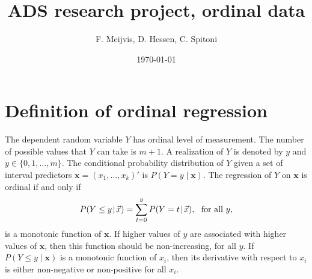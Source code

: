 \documentclass[12pt]{article}
\begin{document}
	
	
\title{ADS research project, ordinal data}%
\author{F. Meijvis, D. Hessen, C. Spitoni}
\date{\today}
	
\maketitle

\section{Definition of ordinal regression}

The dependent random variable $Y$ has ordinal level of measurement. The number of possible values that $Y$ can take is $m+1$. A realization of $Y$ is denoted by $y$ and $y\in\{0,1,\ldots,m\}$. The conditional probability distribution of $Y$ given a set of interval predictors $\mathbf{x}=(x_{1},\ldots,x_{k})'$ is $P(Y=y\!\mid\!\mathbf{x})$. The regression of $Y$ on $\mathbf{x}$ is ordinal if and only if
\begin{equation}
	P(Y\leq y\!\mid\!\vec{x})=\sum_{t=0}^{y}P(Y=t\!\mid\!\vec{x}),\ \ \textup{for all $y$},
\end{equation}
is a monotonic function of $\mathbf{x}$. If higher values of $y$ are associated with higher values of $\mathbf{x}$, then this function should be non-increasing, for all $y$. If $P(Y\leq y\!\mid\!\mathbf{x})$ is a monotonic function of $x_{i}$, then its derivative with respect to $x_{i}$ is either non-negative or non-positive for all $x_{i}$.
\end{document}
